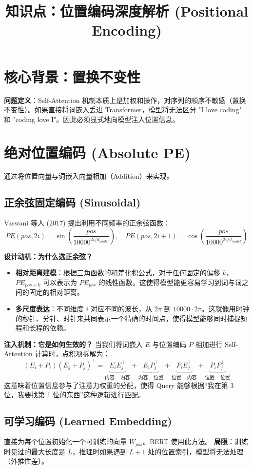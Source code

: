\documentclass[12pt, a4paper]{article}
\title{知识点：位置编码深度解析 (Positional Encoding)}
\author{}
\date{}
\begin{document}
\maketitle

\section{核心背景：置换不变性}
\textbf{问题定义}：Self-Attention 机制本质上是加权和操作，对序列的顺序不敏感（置换不变性）。如果直接将词嵌入丢进 Transformer，模型将无法区分 "I love coding" 和 "coding love I"。因此必须显式地向模型注入位置信息。

\section{绝对位置编码 (Absolute PE)}
通过将位置向量与词嵌入向量相加（Addition）来实现。

\subsection{正余弦固定编码 (Sinusoidal)}
Vaswani 等人 (2017) 提出利用不同频率的正余弦函数：
$$ PE(pos, 2i) = \sin\left(\frac{pos}{10000^{2i/d_{model}}}\right), \quad PE(pos, 2i+1) = \cos\left(\frac{pos}{10000^{2i/d_{model}}}\right) $$

\textbf{设计动机：为什么选正余弦？}
\begin{itemize}
    \item \textbf{相对距离建模}：根据三角函数的和差化积公式，对于任何固定的偏移 $k$，$PE_{pos+k}$ 可以表示为 $PE_{pos}$ 的线性函数。这使得模型能更容易学习到词与词之间的固定的相对距离。
    \item \textbf{多尺度表达}：不同维度 $i$ 对应不同的波长，从 $2\pi$ 到 $10000 \cdot 2\pi$。这就像用时钟的秒针、分针、时针来共同表示一个精确的时间点，使得模型能够同时捕捉短程和长程的依赖。
\end{itemize}

\textbf{注入机制：它是如何生效的？}
当我们将词嵌入 $E$ 与位置编码 $P$ 相加进行 Self-Attention 计算时，点积项拆解为：
$$ (E_i + P_i)(E_j + P_j)^\top = \underbrace{E_i E_j^\top}_{内容-内容} + \underbrace{E_i P_j^\top}_{内容-位置} + \underbrace{P_i E_j^\top}_{位置-内容} + \underbrace{P_i P_j^\top}_{位置-位置} $$
这意味着位置信息参与了注意力权重的分配，使得 Query 能够根据“我在第 3 位，我要找第 1 位的东西”这种逻辑进行匹配。

\subsection{可学习编码 (Learned Embedding)}
直接为每个位置初始化一个可训练的向量 $W_{pos}$。BERT 使用此方法。
\textbf{局限}：训练时见过的最大长度是 $L$，推理时如果遇到 $L+1$ 处的位置索引，模型将无法处理（外推性差）。
\end{document}
